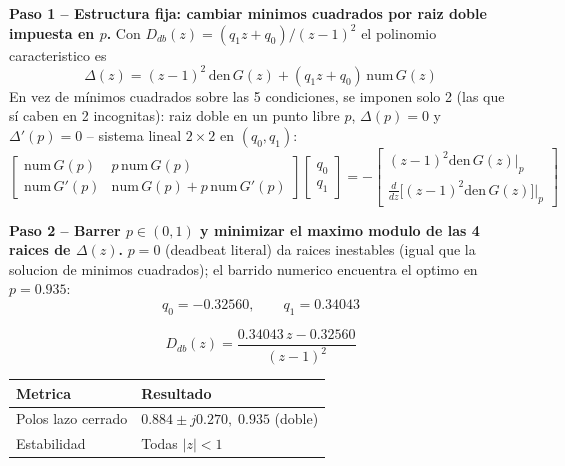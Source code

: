 \documentclass[11pt]{article}
\begin{document}
\textbf{Paso 1 -- Estructura fija: cambiar minimos cuadrados por raiz doble impuesta en $p$.}
Con $D_{db}(z)=(q_1z+q_0)/(z-1)^2$ el polinomio caracteristico es
\begin{equation}
\Delta(z)=(z-1)^2\,\mathrm{den}\,G(z)+(q_1z+q_0)\,\mathrm{num}\,G(z)
\end{equation}
En vez de mínimos cuadrados sobre las 5 condiciones, se imponen solo 2 (las
que sí caben en 2 incognitas): raiz doble en un punto libre $p$,
$\Delta(p)=0$ y $\Delta'(p)=0$ -- sistema lineal $2\times2$ en $(q_0,q_1)$:
\begin{equation}
\begin{bmatrix}\mathrm{num}\,G(p) & p\,\mathrm{num}\,G(p)\\
\mathrm{num}\,G'(p) & \mathrm{num}\,G(p)+p\,\mathrm{num}\,G'(p)\end{bmatrix}
\begin{bmatrix}q_0\\q_1\end{bmatrix}
=-\begin{bmatrix}(z-1)^2\mathrm{den}\,G(z)\big|_p\\ \tfrac{d}{dz}\big[(z-1)^2\mathrm{den}\,G(z)\big]\big|_p\end{bmatrix}
\end{equation}

\textbf{Paso 2 -- Barrer $p\in(0,1)$ y minimizar el maximo modulo de las 4 raices de $\Delta(z)$.}
$p=0$ (deadbeat literal) da raices inestables (igual que la solucion de
minimos cuadrados); el barrido numerico encuentra el optimo en $p=0.935$:
\begin{equation}
q_0=-0.32560,\qquad q_1=0.34043
\end{equation}

\begin{resultbox}
\begin{equation}
D_{db}(z)=\frac{0.34043\,z-0.32560}{(z-1)^2}
\end{equation}
\end{resultbox}

\begin{center}
\begin{tabular}{@{}ll@{}}
\toprule
Metrica & Resultado \\
\midrule
Polos lazo cerrado & $0.884\pm j0.270,\;0.935$ (doble) \\
Estabilidad & Todas $|z|<1$ \\
\bottomrule
\end{tabular}
\end{center}
\end{document}
